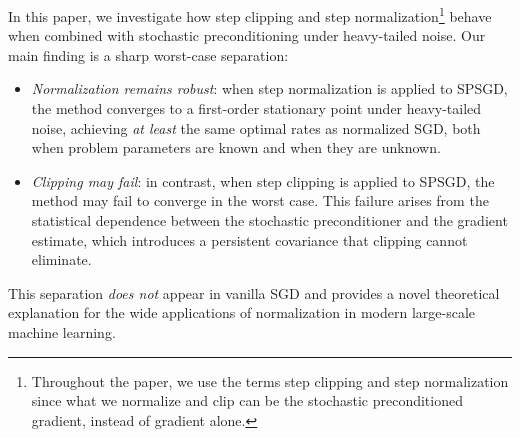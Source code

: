 \documentclass{article}
\theoremstyle{plain}
\theoremstyle{definition}
\theoremstyle{remark}
\begin{document}
In this paper, we investigate how step clipping and step normalization\footnote{Throughout the paper, we use the terms step clipping and step normalization since what we normalize and clip can be the stochastic preconditioned gradient, instead of gradient alone.} behave when combined with stochastic preconditioning under heavy-tailed noise. Our main finding is a sharp worst-case separation:
\begin{itemize}
    \item \textit{Normalization remains robust}: when step normalization is applied to SPSGD, the method converges to a first-order stationary point under heavy-tailed noise, achieving \textit{at least} the same optimal rates as normalized SGD, both when problem parameters are known and when they are unknown.
    \item \textit{Clipping may fail}: in contrast, when step clipping is applied to SPSGD, the method may fail to converge in the worst case. This failure arises from the statistical dependence between the stochastic preconditioner and the gradient estimate, which introduces a persistent covariance that clipping cannot eliminate.
\end{itemize}

This separation \textit{does not} appear in vanilla SGD and provides a novel theoretical explanation for the wide applications of normalization in modern large-scale machine learning.
\end{document}
